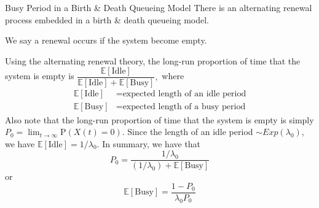 \documentclass[letterpaper,handout]{beamer}
\def\p{\mathrm P}
\def\E{\mathbb E}
\begin{document}
\begin{frame}{Busy Period in a Birth \& Death Queueing Model}
There is an alternating renewal process embedded in a birth \& death queueing model.

We say a renewal occurs if the system become empty.%

Using the alternating renewal theory, the long-run proportion of time that the system is empty is
$\dfrac{\E[\text{Idle}]}{\E[\text{Idle}]+\E[\text{Busy}]},$
where
\begin{align*}
\E[\text{Idle}]&=\text{expected length of an idle period}\\
\E[\text{Busy}]&=\text{expected length of a busy period}
\end{align*}
Also note that the long-run proportion of time that the system is empty is simply $P_0=\lim_{t\to\infty}\p(X(t)=0)$.
Since the length of an idle period $\sim Exp(\lambda_0)$, we have $\E[\text{Idle}]=1/\lambda_0.$
In summary, we have that
$$
P_0=\frac{1/\lambda_0}{(1/\lambda_0)+\E[\text{Busy}]}
$$
or
$$
\E[\text{Busy}]=\frac{1-P_0}{\lambda_0 P_0}
$$
\end{frame}
\end{document}
